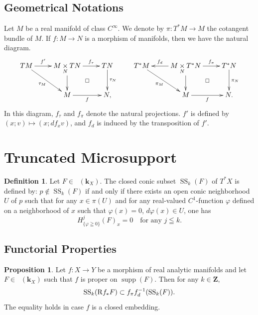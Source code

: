 ﻿\documentclass[a4paper,leqno]{jsarticle}
\theoremstyle{definition}
\newtheorem{Definition+}[Axiom+]{Definition}
\newtheorem{Proposition+}[Axiom+]{Proposition}
\newcommand{\zz}{\mathbf{Z}}
\newcommand{\kk}{\mathbf{k}}
\numberwithin{equation}{section}
\newcommand{\supp}{\mathop{\mathrm{supp}}\nolimits}
\newcommand{\Dompb}{\mathop{\mathsf{D}^\mathrm{b}}\nolimits}
\newcommand{\muS}[1][]{\mathop{\mathrm{SS}}\nolimits_{#1}}
\newcommand{\Rder}[1][]{\mathop{\mathrm{R}^{#1}\hspace{-2pt}}\nolimits}
\newcommand{\dpb}[1][]{\mathbin{\mathop{\times}\limits_{#1}}}
\theoremstyle{mystyle}
\newcommand{\mpb}[1][]{{#1}_{\pi}} %
\newcommand{\mdiff}[1][]{{#1}_{d}} %
\newcommand{\mptan}[1][]{{#1}_{\tau}} %
\newcommand{\cotb}[1][]{T^{\ast}{#1}}
\begin{document}
\subsection*{Geometrical Notations}
Let \(M\) be a real manifold of class \(C^\infty\). 
We denote by \(\pi\colon \cotb[M] \to M\) 
the cotangent bundle of \(M\). 
If \(f\colon M\to N\) is a morphism of manifolds, 
then we have the natural diagram. 
\[\vcenter{\xymatrix{
  TM
    \ar[r]^-{f'}
    \ar[rd]_-{\tau_M} 
  &
  M\dpb[N]TN
    \ar[r]^-{\mptan[f]}
    \ar[d]
    \ar@{}[dr]|\square
  & 
  TN
    \ar[d]^-{\tau_N}
  &
  \cotb[M]
    \ar[rd]_-{\pi_M}
  &
  M\dpb[N]\cotb[N]
    \ar[l]_-{\mdiff[f]}
    \ar[r]^-{\mpb[f]}
    \ar[d]
    \ar@{}[dr]|\square
  &
  \cotb[N]
    \ar[d]^{\pi_N}
  \\
  &
  M
    \ar[r]_-{f}
  &
  N,
  &
  &
  M
    \ar[r]_-{f}
  &
  N.
}}\]
In this diagram, 
\(\mptan[f]\) and \(\mpb[f]\) denote 
the natural projections. \(f'\) is defined by 
\((x;v)\mapsto (x;df_{x}v)\), 
and \(\mdiff[f]\) is induced by the transposition of \(f'\). 

\section{Truncated Microsupport}

\begin{Definition+}
  Let \(F\in\Dompb(\kk_X)\). 
  The closed conic subset \(\muS[k](F)\) of \(\cotb[X]\) 
  is defined by: \(p\notin \muS[k](F)\) 
  if and only if 
  there exists an open conic neighborhood \(U\) of \(p\) 
  such that for any \(x\in \pi(U)\) and 
  for any real-valued \(C^{1}\)-function \(\varphi\) 
  defined on a neighborhood of \(x\) such that 
  \(\varphi(x)=0\), \(d\varphi(x)\in U\), 
  one has \begin{equation}
    H^{j}_{\{\varphi\geqq0\}}(F)_x=0
    \quad \text{for any \(j\leqq k\).}
  \end{equation}
\end{Definition+}

\subsection*{Functorial Properties} 
\begin{Proposition+}
  Let \(f\colon X\to Y\) be a morphism of real analytic manifolds and let \(F\in\Dompb(\kk_X)\) such that \(f\) is proper on \(\supp(F)\). 
  Then for any \(k\in\zz\), 
  \begin{equation}\label{eq:t-push}
    \muS[k](\Rder{f_{\ast}}F)\subset
    \mpb[f]\mdiff[f]^{-1}(\muS[k](F)).
  \end{equation}
  The equality holds in case \(f\) is a closed embedding.
\end{Proposition+}
\end{document}
